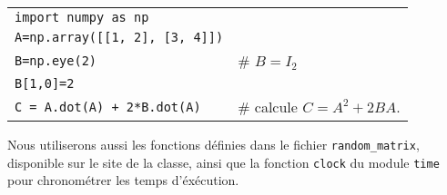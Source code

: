 \begin{tabular}{ll}

\noindent\texttt{import numpy as np} &\\
\texttt{A=np.array([[1, 2], [3, 4]])} &%
\\
\texttt{B=np.eye(2)} &$\#$ $B=I_2$
\\
\texttt{B[1,0]=2} &%
\\
\texttt{C = A.dot(A) + 2*B.dot(A)} &$\#$ calcule $C=A^2+2BA$.\\

\end{tabular}

\vspace{1cm}

Nous utiliserons aussi les fonctions définies dans le fichier \texttt{random\_matrix}, disponible 
sur le site de la classe, ainsi que la fonction \texttt{clock} du module \texttt{time} pour 
chronométrer les temps d'éxécution.\\


